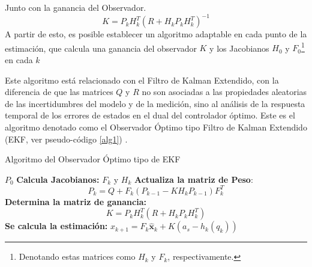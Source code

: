 \documentclass[10pt]{report}
\numberwithin{equation}{chapter}
\numberwithin{algorithm}{chapter}
\newcommand{\vect}[1]{\boldsymbol{#1}}
\begin{document}
Junto con la ganancia del Observador. \begin{equation}\label{filtro_ecc11}
K=P_kH_k^T(R+H_kP_kH_k^T)^{-1}
\end{equation}
A partir de esto, es posible establecer un algoritmo adaptable en cada punto de la estimación, que calcula una ganancia del observador $K$ y los Jacobianos $H_0$ y $F_0$\footnote{Denotando estas matrices como $H_k$ y $F_k$, respectivamente.} en cada $k$ \par
Este algoritmo está relacionado con el Filtro de Kalman Extendido, con la diferencia de que las matrices $Q$ y $R$ no son asociadas a las propiedades aleatorias de las incertidumbres del modelo y de la medición, sino al análisis de la respuesta temporal de los errores de estados en el dual del controlador óptimo. Este es el algoritmo denotado como el Observador Óptimo tipo Filtro de Kalman Extendido (EKF, ver pseudo-código \ref{alg1}) .\par
\begin{algorithm}[h!]
\caption{Algoritmo del Observador Óptimo tipo de EKF}
\label{alg1}
\begin{algorithmic}
\Require $P_0$
\State \textbf{Calcula Jacobianos:} $F_k$ y $H_k$
\State\textbf{Actualiza la matriz de Peso}: 
$$P_k=Q+F_k(P_{k-1}-KH_{k}P_{k-1})F_k^T$$
\State \textbf{Determina la matriz de ganancia:}$$K=P_kH_k^T(R+H_kP_kH_k^T)$$
\State\textbf{Se calcula la estimación:}
\State $\hat{x}_{k+1} = F_k\hat{\vect{x}}_k+K(a_s-h_k(q_k))$
\end{algorithmic}
\end{algorithm}
\end{document}
